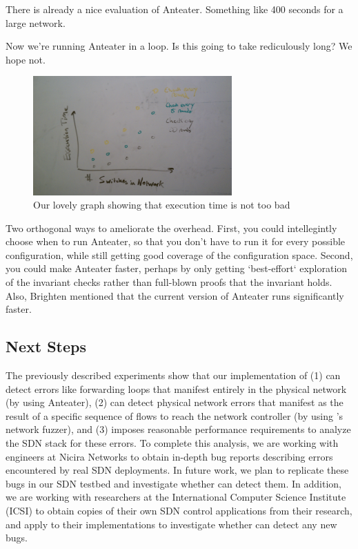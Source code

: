     There is already a nice evaluation of Anteater. Something like 400 seconds for
    a large network.

    Now we're running Anteater in a
    loop. Is this going to take rediculously long? We hope not.

    \begin{figure}[t]
        \centering
        \includegraphics[width=3in]{../graphs/mock_overhead_graph.jpg}
        \caption[]{\label{fig:loop} Our lovely graph showing that execution time
        is not too bad\vspace{-10pt}} 
    \end{figure}

    Two orthogonal ways to ameliorate the overhead. First, you could intellegintly choose
    when to run Anteater, so that you don't have to run it for every possible
    configuration, while still getting good coverage of the
    configuration space. Second, you could make Anteater faster, perhaps by only
    getting `best-effort` exploration of the invariant checks rather than
    full-blown proofs that the invariant holds. Also, Brighten mentioned that the
    current version of Anteater runs significantly faster.

    \subsection{Next Steps}
        The previously described experiments show that our implementation of \projectname{} (1) can detect errors like forwarding loops that manifest entirely in the physical network (by using Anteater), (2) can detect physical network errors that manifest as the result of a specific sequence of flows to reach the network controller (by using \projectname{}'s network fuzzer), and (3) imposes reasonable performance requirements to analyze the SDN stack for these errors.
        To complete this analysis, we are working with engineers at Nicira Networks to obtain in-depth bug reports describing errors encountered by real SDN deployments.
        In future work, we plan to replicate these bugs in our SDN testbed and investigate whether \projectname{} can detect them.
        In addition, we are working with researchers at the International Computer Science Institute (ICSI) to obtain copies of their own SDN control applications from their research, and apply \projectname{} to their implementations to investigate whether \projectname{} can detect any new bugs.

